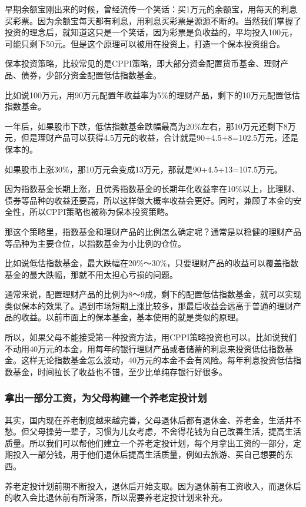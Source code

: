早期余额宝刚出来的时候，曾经流传一个笑话：买1万元的余额宝，用每天的利息买彩票。因为余额宝每天都有利息，用利息买彩票是源源不断的。当然我们掌握了投资的理念后，就知道这只是一个笑话，因为彩票是负收益的，平均投入100元，可能只剩下50元。但是这个原理可以被用在投资上，打造一个保本投资组合。

保本投资策略，比较常见的是CPPI策略，即大部分资金配置货币基金、理财产品、债券，少部分资金配置低估指数基金。

比如说100万元，用90万元配置年收益率为5\%的理财产品，剩下的10万元配置低估指数基金。

一年后，如果股市下跌，低估指数基金跌幅最高为20\%左右，那10万元还剩下8万元，但是理财产品可以获得4.5万元的收益，合计就是90+4.5+8=102.5万元，还是保本的。

如果股市上涨30\%，那10万元会变成13万元，那就是90+4.5+13=107.5万元。

因为指数基金长期上涨，且优秀指数基金的长期年化收益率在10\%以上，比理财、债券等品种的收益还要高，所以这样做大概率收益会更好。同时，兼顾了本金的安全性，所以CPPI策略也被称为保本投资策略。

那这个策略里，指数基金和理财产品的比例怎么确定呢？通常是以稳健的理财产品等品种为主要仓位，以指数基金为小比例的仓位。

比如说低估指数基金，最大跌幅在20\%～30\%，只要理财产品的收益可以覆盖指数基金的最大跌幅，那就不用太担心亏损的问题。

通常来说，配置理财产品的比例为8～9成，剩下的配置低估指数基金，就可以实现类似保本的效果了。遇到市场短期上涨比较多，那最后收益会远高于普通的理财产品的收益。以前市面上的保本基金，基本使用的就是类似的原理。

所以，如果父母不能接受第一种投资方法，用CPPI策略投资也可以。比如说我们不动用40万元的本金，用每年的银行理财产品或者储蓄的利息来投资低估指数基金。这样无论指数基金怎么波动，40万元的本金不会有风险。每年利息投资低估指数基金，时间拉长了收益也不错，至少比单纯存银行好很多。

\subsubsection{拿出一部分工资，为父母构建一个养老定投计划}

其实，国内现在养老制度越来越完善，父母退休后都有退休金、养老金，生活并不愁。但父母操劳一辈子，习惯为儿女考虑，不舍得花钱为自己改善生活，提高生活质量。所以我们可以帮他们建立一个养老定投计划，每个月拿出工资的一部分，定期投入一部分钱，用于他们退休后提高生活质量，例如去旅游、买自己想要的东西。

养老定投计划前期不断投入，退休后开始支取。因为退休前有工资收入，而退休后的收入会比退休前有所滑落，所以需要养老定投计划来补充。

